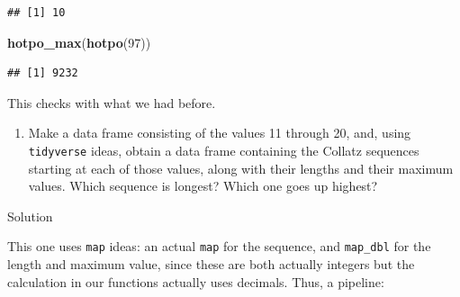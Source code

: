 \documentclass[]{tufte-book}
\newenvironment{Shaded}{}{}
\newcommand{\DataTypeTok}[1]{\textcolor[rgb]{0.56,0.13,0.00}{#1}}
\newcommand{\DecValTok}[1]{\textcolor[rgb]{0.25,0.63,0.44}{#1}}
\newcommand{\KeywordTok}[1]{\textcolor[rgb]{0.00,0.44,0.13}{\textbf{#1}}}
\newcommand{\NormalTok}[1]{#1}
\newcommand{\OperatorTok}[1]{\textcolor[rgb]{0.40,0.40,0.40}{#1}}
\newcommand{\StringTok}[1]{\textcolor[rgb]{0.25,0.44,0.63}{#1}}
\providecommand{\tightlist}{%
  \setlength{\itemsep}{0pt}\setlength{\parskip}{0pt}}
\theoremstyle{definition}
\theoremstyle{definition}
\theoremstyle{definition}
\theoremstyle{remark}
\begin{document}
\begin{verbatim}
## [1] 10
\end{verbatim}

\begin{Shaded}
\begin{Highlighting}[]
\KeywordTok{hotpo_max}\NormalTok{(}\KeywordTok{hotpo}\NormalTok{(}\DecValTok{97}\NormalTok{))}
\end{Highlighting}
\end{Shaded}

\begin{verbatim}
## [1] 9232
\end{verbatim}

This checks with what we had before.

\begin{enumerate}
\def\labelenumi{(\alph{enumi})}
\setcounter{enumi}{5}
\tightlist
\item
  Make a data frame consisting of the values 11 through 20, and, using
  \texttt{tidyverse} ideas, obtain a data frame containing the Collatz
  sequences starting at each of those values, along with their lengths
  and their maximum values. Which sequence is longest? Which one goes up
  highest?
\end{enumerate}

Solution

This one uses \texttt{map} ideas: an actual \texttt{map} for the
sequence, and \texttt{map\_dbl} for the length and maximum value, since
these are both actually integers but the calculation in our functions
actually uses decimals.
Thus, a pipeline:

\begin{Shaded}
\end{Shaded}
\end{document}
